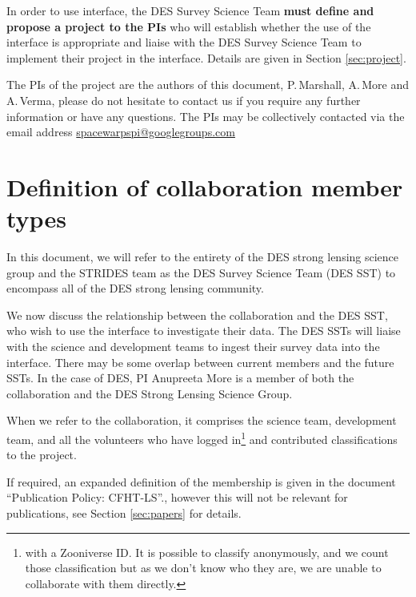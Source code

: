 \documentclass[a4paper,twocolumn]{article}
\begin{document}
In order to use \sw interface, the DES Survey Science Team \textbf{must define and propose a project to the \sw PIs} who will establish whether the use of the \sw interface is appropriate and liaise with the DES Survey Science Team to implement their project in the \sw interface. Details are given in  Section \ref{sec:project}.

\vspace{2mm}
The PIs of the \sw project are the authors of this document, P.\,Marshall, 
A.\,More and A.\,Verma, please do not hesitate to contact us if you require any further information or have any questions. The PIs may be collectively contacted via the email address \href{mailto:spacewarpspi@googlegroups.com}{spacewarpspi@googlegroups.com}




\section{Definition of collaboration member types}
\label{sec:members}

In this document, we will refer to the entirety of the DES strong lensing science group and the STRIDES team as the DES Survey Science Team (DES SST) to encompass all of the DES strong lensing community.

We now discuss the relationship between the \sw collaboration and the DES SST, who wish to use the \sw interface to investigate their data. The DES SSTs will liaise with the \sw science and development teams to ingest their survey data into the \sw interface. There may be some overlap between current \sw members and the future SSTs. In the case of DES, \sw PI Anupreeta More is a member of both the \sw collaboration and the DES Strong Lensing Science Group.

When we refer to the \sw collaboration, it comprises the \sw science team, \sw development team, and all the volunteers who have 
logged in\footnote{with a Zooniverse ID. It is possible to classify anonymously, and we count those classification but as we don't know who they are, we are unable to collaborate with them directly.} and contributed classifications to the project. 

If required, an expanded definition of the \sw membership is given in the document ``\sw Publication Policy: CFHT-LS''., however this will not be relevant for publications, see Section \ref{sec:papers} for details.
\end{document}
